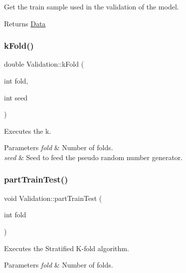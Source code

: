 Get the train sample used in the validation of the model. 

\begin{DoxyReturn}{Returns}
\hyperlink{class_data}{Data} 
\end{DoxyReturn}
\mbox{\label{class_validation_a3aae72caef37b12a57aaf5cdd862de3a}} 
\subsubsection{\texorpdfstring{k\+Fold()}{kFold()}}
{\footnotesize\ttfamily double Validation\+::k\+Fold (\begin{DoxyParamCaption}\item[{int}]{fold,  }\item[{int}]{seed }\end{DoxyParamCaption})}



Executes the k. 


\begin{DoxyParams}{Parameters}
{\em fold} & Number of folds. \\
\hline
{\em seed} & Seed to feed the pseudo random number generator. \\
\hline
\end{DoxyParams}
\mbox{\label{class_validation_afc2e7f15bc873853b70e2cc3c47eecdc}} 
\subsubsection{\texorpdfstring{part\+Train\+Test()}{partTrainTest()}}
{\footnotesize\ttfamily void Validation\+::part\+Train\+Test (\begin{DoxyParamCaption}\item[{int}]{fold }\end{DoxyParamCaption})}



Executes the Stratified K-\/fold algorithm. 


\begin{DoxyParams}{Parameters}
{\em fold} & Number of folds. \\
\hline
\end{DoxyParams}
\mbox{\label{class_validation_ac402fbabbd6148d7c2ac0c7c9a854177}} 
